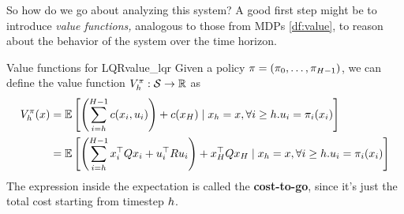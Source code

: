 \documentclass[../main/main]{subfiles}
\begin{document}
So how do we go about analyzing this system? A good first step might be to introduce \emph{value functions,} analogous to those from MDPs \eqref{df:value}, to reason about the behavior of the system over the time horizon.

\begin{definition}{Value functions for LQR}{value_lqr}
    Given a policy $\mathbf{\pi} = (\pi_0, \dots, \pi_{H-1})$, we can define the
    value function $V^\pi_h : \mathcal{S} \to \mathbb{R}$ as
    \[
        \begin{split}
            V^\pi_h (x) &= \operatorname*{\mathbb{E}} \left[ \left( \sum_{i=h}^{H-1} c(x_i, u_i) \right) + c(x_H) \mid x_h = x,  \forall i \ge h. u_i = \pi_i(x_i) \right] \\
            &= \operatorname*{\mathbb{E}} \left[ \left( \sum_{i=h}^{H-1} x_i^\top Q x_i + u_i^\top R u_i \right) + x_H^\top Q x_H \mid x_h = x, \forall i \ge h. u_i = \pi_i(x_i) \right] \\
        \end{split}
    \]
    The expression inside the expectation is called the \textbf{cost-to-go},
    since it's just the total cost starting from timestep $h$.


\end{definition}
\end{document}
